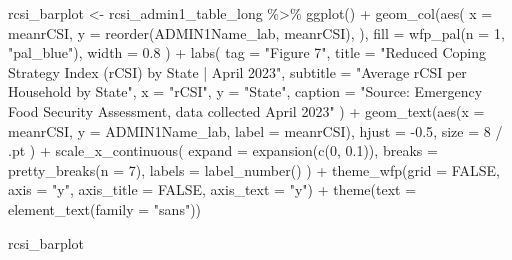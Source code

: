 \documentclass[
  letterpaper,
  DIV=11,
  numbers=noendperiod]{scrreprt}
\newenvironment{Shaded}{\begin{snugshade}}{\end{snugshade}}
\newcommand{\AttributeTok}[1]{\textcolor[rgb]{0.40,0.45,0.13}{#1}}
\newcommand{\ConstantTok}[1]{\textcolor[rgb]{0.56,0.35,0.01}{#1}}
\newcommand{\DecValTok}[1]{\textcolor[rgb]{0.68,0.00,0.00}{#1}}
\newcommand{\FloatTok}[1]{\textcolor[rgb]{0.68,0.00,0.00}{#1}}
\newcommand{\FunctionTok}[1]{\textcolor[rgb]{0.28,0.35,0.67}{#1}}
\newcommand{\NormalTok}[1]{\textcolor[rgb]{0.00,0.23,0.31}{#1}}
\newcommand{\OtherTok}[1]{\textcolor[rgb]{0.00,0.23,0.31}{#1}}
\newcommand{\SpecialCharTok}[1]{\textcolor[rgb]{0.37,0.37,0.37}{#1}}
\newcommand{\StringTok}[1]{\textcolor[rgb]{0.13,0.47,0.30}{#1}}
\begin{document}
\begin{Shaded}
\begin{Highlighting}[]
\NormalTok{rcsi\_barplot }\OtherTok{\textless{}{-}}\NormalTok{ rcsi\_admin1\_table\_long }\SpecialCharTok{\%\textgreater{}\%} \FunctionTok{ggplot}\NormalTok{() }\SpecialCharTok{+}
  \FunctionTok{geom\_col}\NormalTok{(}\FunctionTok{aes}\NormalTok{(}
    \AttributeTok{x =}\NormalTok{ meanrCSI,}
    \AttributeTok{y =} \FunctionTok{reorder}\NormalTok{(ADMIN1Name\_lab, meanrCSI),}
\NormalTok{  ),}
  \AttributeTok{fill =} \FunctionTok{wfp\_pal}\NormalTok{(}\AttributeTok{n =} \DecValTok{1}\NormalTok{, }\StringTok{"pal\_blue"}\NormalTok{),}
  \AttributeTok{width =} \FloatTok{0.8}
\NormalTok{  ) }\SpecialCharTok{+}
  \FunctionTok{labs}\NormalTok{(}
    \AttributeTok{tag =} \StringTok{"Figure 7"}\NormalTok{,}
    \AttributeTok{title =} \StringTok{"Reduced Coping Strategy Index (rCSI) by State | April 2023"}\NormalTok{,}
    \AttributeTok{subtitle =} \StringTok{"Average rCSI  per Household by State"}\NormalTok{,}
    \AttributeTok{x =} \StringTok{"rCSI"}\NormalTok{,}
    \AttributeTok{y =} \StringTok{"State"}\NormalTok{,}
    \AttributeTok{caption =} \StringTok{"Source: Emergency Food Security Assessment, data collected April 2023"}
\NormalTok{  ) }\SpecialCharTok{+} \FunctionTok{geom\_text}\NormalTok{(}\FunctionTok{aes}\NormalTok{(}\AttributeTok{x =}\NormalTok{ meanrCSI,}
                    \AttributeTok{y =}\NormalTok{ ADMIN1Name\_lab, }\AttributeTok{label =}\NormalTok{ meanrCSI),}
                \AttributeTok{hjust =} \SpecialCharTok{{-}}\FloatTok{0.5}\NormalTok{,}
                \AttributeTok{size =} \DecValTok{8} \SpecialCharTok{/}\NormalTok{ .pt}
\NormalTok{  ) }\SpecialCharTok{+}
  \FunctionTok{scale\_x\_continuous}\NormalTok{(}
    \AttributeTok{expand =} \FunctionTok{expansion}\NormalTok{(}\FunctionTok{c}\NormalTok{(}\DecValTok{0}\NormalTok{, }\FloatTok{0.1}\NormalTok{)),}
    \AttributeTok{breaks =} \FunctionTok{pretty\_breaks}\NormalTok{(}\AttributeTok{n =} \DecValTok{7}\NormalTok{),}
    \AttributeTok{labels =} \FunctionTok{label\_number}\NormalTok{()}
\NormalTok{  ) }\SpecialCharTok{+} \FunctionTok{theme\_wfp}\NormalTok{(}\AttributeTok{grid =} \ConstantTok{FALSE}\NormalTok{, }\AttributeTok{axis =} \StringTok{"y"}\NormalTok{, }\AttributeTok{axis\_title =} \ConstantTok{FALSE}\NormalTok{, }\AttributeTok{axis\_text =} \StringTok{"y"}\NormalTok{) }\SpecialCharTok{+} \FunctionTok{theme}\NormalTok{(}\AttributeTok{text =} \FunctionTok{element\_text}\NormalTok{(}\AttributeTok{family =} \StringTok{"sans"}\NormalTok{))}

\NormalTok{rcsi\_barplot}
\end{Highlighting}
\end{Shaded}
\end{document}
